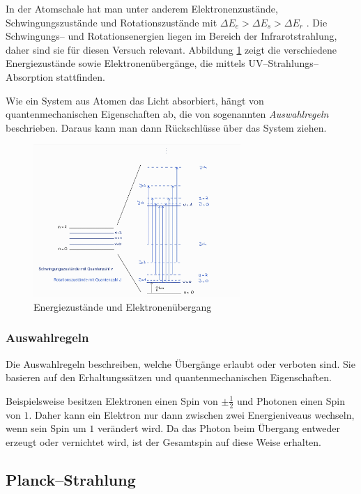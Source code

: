 \documentclass[12pt,a4paper]{scrartcl}
\numberwithin{equation}{section} %
\begin{document}
	In der Atomschale hat man unter anderem Elektronenzustände, Schwingungszustände und Rotationszustände mit $\Delta E_{e} > \Delta E_{s} > \Delta E_{r}$ \cite{Agilent Technologies}. Die Schwingungs-- und Rotationsenergien liegen im Bereich der Infrarotstrahlung, daher sind sie für diesen Versuch relevant. Abbildung \ref{abb:Übergänge} zeigt die verschiedene Energiezustände sowie Elektronenübergänge, die mittels UV--Strahlungs--Absorption stattfinden.
	
	Wie ein System aus Atomen das Licht absorbiert, hängt von quantenmechanischen Eigenschaften ab, die von sogenannten \emph{Auswahlregeln} beschrieben. Daraus kann man dann Rückschlüsse über das System ziehen.
	
	\begin{figure}[h!]
		\centering
		\includegraphics[width=0.7\textwidth]{../media/B1.1/Uebergaenge.jpg}
		\caption{Energiezustände und Elektronenübergang \cite{Agilent Technologies}}
		\label{abb:Übergänge}
	\end{figure}
	
	\subsubsection{Auswahlregeln}
	Die Auswahlregeln beschreiben, welche Übergänge erlaubt oder verboten sind. Sie basieren auf den Erhaltungssätzen und quantenmechanischen Eigenschaften.
	
	Beispielsweise besitzen Elektronen einen Spin von $\pm\frac{1}{2}$ und Photonen einen Spin von $1$. Daher kann ein Elektron nur dann zwischen zwei Energieniveaus wechseln, wenn sein Spin um $1$ verändert wird. Da das Photon beim Übergang entweder erzeugt oder vernichtet wird, ist der Gesamtspin auf diese Weise erhalten.
	
	\hypertarget{planckstrahlung}{%
		\subsection{Planck--Strahlung}\label{planckstrahlung}}
	
\end{document}
